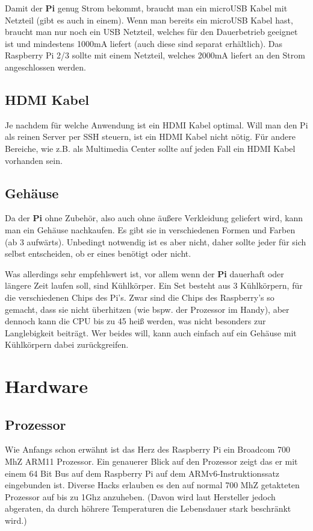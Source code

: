 \documentclass[12pt,a4paper]{article}
\begin{document}
Damit der \textbf{Pi} genug Strom bekommt, braucht man ein microUSB Kabel mit Netzteil (gibt es auch in einem). Wenn man bereits ein microUSB Kabel hast, braucht man nur noch ein USB Netzteil, welches für den Dauerbetrieb geeignet ist und mindestens 1000mA liefert (auch diese sind separat erhältlich). Das Raspberry Pi 2/3 sollte mit einem Netzteil, welches 2000mA liefert an den Strom angeschlossen werden.

\subsection{HDMI Kabel}

Je nachdem für welche Anwendung ist ein HDMI Kabel optimal. Will man den Pi als reinen Server per SSH steuern, ist ein HDMI Kabel nicht nötig. Für andere Bereiche, wie z.B. als Multimedia Center sollte auf jeden Fall ein HDMI Kabel vorhanden sein.

\subsection{Gehäuse}

Da der \textbf{Pi} ohne Zubehör, also auch ohne äußere Verkleidung geliefert wird, kann man ein Gehäuse nachkaufen. Es gibt sie in verschiedenen Formen und Farben (ab 3 aufwärts). Unbedingt notwendig ist es aber nicht, daher sollte jeder für sich selbst entscheiden, ob er eines benötigt oder nicht.

Was allerdings sehr empfehlswert ist, vor allem wenn der \textbf{Pi} dauerhaft oder längere Zeit laufen soll, sind Kühlkörper. Ein Set besteht aus 3 Kühlkörpern, für die verschiedenen Chips des Pi's. Zwar sind die Chips des Raspberry’s so gemacht, dass sie nicht überhitzen (wie bspw. der Prozessor im Handy), aber dennoch kann die CPU bis zu 45 heiß werden, was nicht besonders zur Langlebigkeit beiträgt. Wer beides will, kann auch einfach auf ein Gehäuse mit Kühlkörpern dabei zurückgreifen.

\section{Hardware}

\subsection{Prozessor}

Wie Anfangs schon erwähnt ist das Herz des Raspberry Pi ein Broadcom 700 MhZ ARM11 Prozessor.  Ein genauerer Blick auf den Prozessor zeigt das er mit einem 64 Bit Bus auf dem Raspberry Pi auf dem ARMv6-Instruktionssatz eingebunden ist.
Diverse Hacks erlauben es den auf normal 700 MhZ getakteten Prozessor auf bis zu 1Ghz anzuheben. (Davon wird laut Hersteller jedoch abgeraten, da durch höhrere Temperaturen die Lebensdauer stark beschränkt wird.)
\end{document}
